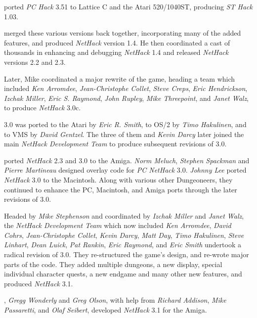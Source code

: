\medskip
{} ported {\it PC Hack\/} 3.51 to Lattice C and the Atari
520/1040ST, producing {\it ST Hack\/} 1.03.

\medskip
{} merged these various versions back together,
incorporating many of the added features, and produced {\it NetHack\/} version
1.4.  He then coordinated a cast of thousands in enhancing and debugging
{\it NetHack\/} 1.4 and released {\it NetHack\/} versions 2.2 and 2.3.

\medskip
\nd Later, Mike coordinated a major rewrite of the game, heading a team which
included {\it Ken Arromdee}, {\it Jean-Christophe Collet}, {\it Steve Creps},
{\it Eric Hendrickson}, {\it Izchak Miller}, {\it Eric S. Raymond}, {\it John
Rupley}, {\it Mike Threepoint}, and {\it Janet Walz}, to produce {\it
NetHack\/} 3.0c.

\medskip
{} 3.0 was ported to the Atari by {\it Eric R. Smith}, to OS/2 by
{\it Timo Hakulinen}, and to VMS by {\it David Gentzel}.  The three of them
and {\it Kevin Darcy\/} later joined the main {\it NetHack Development Team} to produce
subsequent revisions of 3.0.

\medskip
{} ported {\it NetHack\/} 2.3 and 3.0 to the Amiga.  {\it
Norm Meluch}, {\it Stephen Spackman\/} and {\it Pierre Martineau\/} designed
overlay code for {\it PC NetHack\/} 3.0.  {\it Johnny Lee\/} ported {\it
NetHack\/} 3.0 to the Macintosh.  Along with various other Dungeoneers, they
continued to enhance the PC, Macintosh, and Amiga ports through the later
revisions of 3.0.

\medskip
\nd Headed by {\it Mike Stephenson\/} and coordinated by {\it Izchak Miller\/} and
{\it Janet Walz}, the {\it NetHack Development Team} which now included {\it Ken Arromdee},
{\it David Cohrs}, {\it Jean-Christophe Collet}, {\it Kevin Darcy},
{\it Matt Day}, {\it Timo Hakulinen}, {\it Steve Linhart}, {\it Dean Luick},
{\it Pat Rankin}, {\it Eric Raymond}, and {\it Eric Smith\/} undertook a radical
revision of 3.0.  They re-structured the game's design, and re-wrote major
parts of the code.  They added multiple dungeons, a new display, special
individual character quests, a new endgame and many other new features, and
produced {\it NetHack\/} 3.1.

\medskip
{}, {\it Gregg Wonderly\/} and {\it Greg Olson}, with help
from {\it Richard Addison}, {\it Mike Passaretti}, and {\it Olaf Seibert},
developed {\it NetHack\/} 3.1 for the Amiga.

